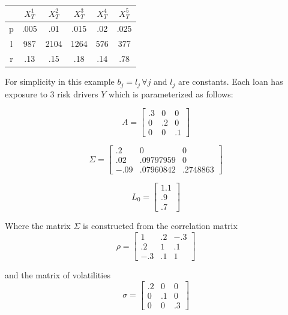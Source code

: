 \documentclass[12pt]{article}
\theoremstyle{definition}
\begin{document}
\begin{table}[H]
\centering
\begin{tabular}{cccccc}
&\(X_T^1\) & \(X_T^2\)& \(X_T^3\)& \(X_T^4\)& \(X_T^5\) \\
\hline
p& .005 & .01& .015& .02& .025 \\
l & 987 &2104 & 1264 & 576 &377 \\
r & .13 & .15 & .18 & .14 & .78 \\
\end{tabular}
\end{table}

For simplicity in this example \(b_j=l_j\, \forall j\) and \(l_j\) are constants.  Each loan has exposure to 3 risk drivers \(Y\) which is parameterized as follows:

\begin{equation}
{A}=\left[ \begin{array}{ccc} .3 & 0& 0 \\ 0 & .2 & 0 \\ 0 & 0 & .1 \end{array} \right]
\end{equation}

\begin{equation}
{\Sigma}=\left[\begin{array}{ccc} .2 & 0 & 0 \\ .02 & .09797959 & 0 \\ -.09 & .07960842 & .2748863 \end{array}\right]
\end{equation}

\begin{equation}
{L}_0=\left[ \begin{array}{c}1.1\\.9\\.7 \end{array} \right]
\end{equation}

Where the matrix \({\Sigma}\) is constructed from the correlation matrix
\begin{equation}
{\rho}=\left[\begin{array}{ccc} 1 & .2 & -.3 \\ .2 & 1 & .1 \\ -.3 & .1 & 1 \end{array}\right]
\end{equation}

and the matrix of volatilities
\begin{equation}{\sigma}=
\left[\begin{array}{ccc} .2 & 0 & 0\\ 0 & .1 & 0 \\0 & 0 & .3 \end{array}\right]
\end{equation}
\end{document}
